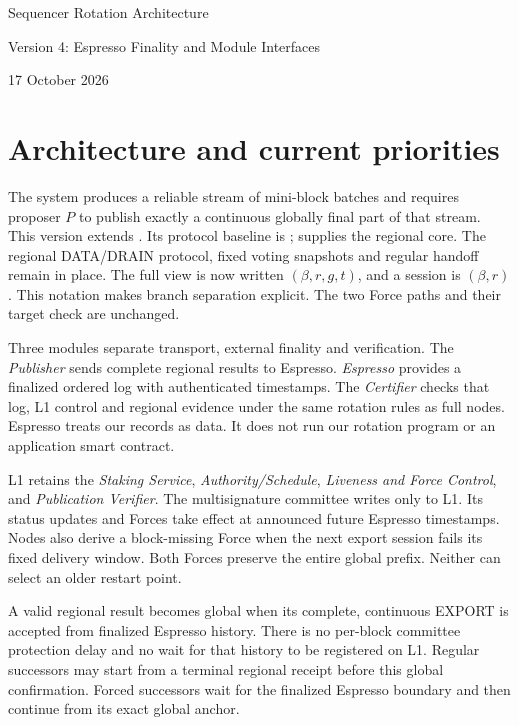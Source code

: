 \documentclass[11pt,a4paper]{article}
\newcommand{\src}[2]{\href{#1}{\texttt{\detokenize{#2}}}}
\begin{document}
\begin{center}
{\LARGE Sequencer Rotation Architecture\par}\vspace{5pt}
{\large Version 4: Espresso Finality and Module Interfaces\par}\vspace{8pt}
17 October 2026
\end{center}

\section{Architecture and current priorities}\label{sec:overview}
The system produces a reliable stream of mini-block batches and requires
proposer $P$ to publish exactly a continuous globally final part of that
stream. This version extends
\src{arch_v3.tex}{architecture v3}. Its protocol baseline is
\src{sync_hotstuff_rr_part2_rotation_v3.tex}{Sync HotStuff RR, Part II v3};
\src{sync_hotstuff_rr_part1_core.tex}{Part I} supplies the regional core.
The regional DATA/DRAIN protocol, fixed voting snapshots and regular
handoff remain in place. The full view is now written
$(\beta,r,g,t)$, and a session is $(\beta,r)$. This notation makes
branch separation explicit. The two Force paths and their target check
are unchanged.

Three modules separate transport, external finality and verification.
The \emph{Publisher} sends complete regional results to Espresso.
\emph{Espresso} provides a finalized ordered log with authenticated
timestamps. The \emph{Certifier} checks that log, L1 control and regional
evidence under the same rotation rules as full nodes. Espresso treats
our records as data. It does not run our rotation program or an
application smart contract.

L1 retains the \emph{Staking Service}, \emph{Authority/Schedule},
\emph{Liveness and Force Control}, and \emph{Publication Verifier}.
The multisignature committee writes only to L1. Its status updates and
Forces take effect at announced future Espresso timestamps. Nodes also
derive a block-missing Force when the next export session fails its
fixed delivery window. Both Forces preserve the entire global prefix.
Neither can select an older restart point.

A valid regional result becomes global when its complete, continuous
EXPORT is accepted from finalized Espresso history. There is no
per-block committee protection delay and no wait for that history to
be registered on L1. Regular successors may start from a terminal
regional receipt before this global confirmation. Forced successors
wait for the finalized Espresso boundary and then continue from its
exact global anchor.
\end{document}

